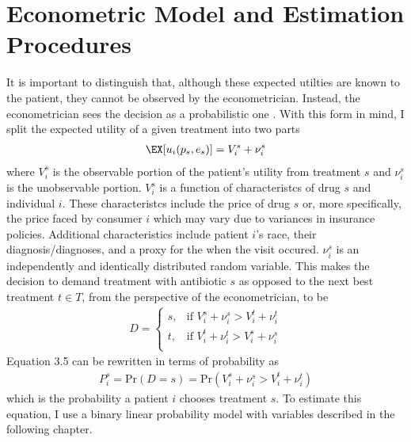 \section{Econometric Model and Estimation Procedures}
\indent It is important to distinguish that, although these expected utilties are known to the patient, they cannot be observed by the econometrician. Instead, the econometrician sees the decision as a probabilistic one \cite{train_discrete_nodate, templeton_household_2008}. With this form in mind, I split the expected utility of a given treatment into two parts
\begin{eqnarray}
\EX[u_i(p_s,e_s)] = V_i^s + \nu_i^s
\end{eqnarray}
where $V_i^s$ is the observable portion of the patient's utility from treatment $s$ and $\nu_i^s$ is the unobservable portion. $V_i^s$ is a function of characteristcs of drug $s$ and individual $i$. These characteristcs include the price of drug $s$ or, more specifically, the price faced by consumer $i$ which may vary due to variances in insurance policies. Additional characteristics include patient $i$'s race, their diagnosis/diagnoses, and a proxy for the when the visit occured. $\nu_i^s$ is an independently and identically distributed random variable. This makes the decision to demand treatment with antibiotic $s$ as opposed to the next best treatment $t \in T$, from the perspective of the econometrician, to be
\begin{eqnarray}
  D =
  \begin{cases}
                                   s, & \text{if }V_i^s + \nu_i^s > V_i^t + \nu_i^t \\
                                   t, & \text{if }V_i^t + \nu_i^t > V_i^s + \nu_i^s \\
  \end{cases}
\end{eqnarray}
Equation 3.5 can be rewritten in terms of probability as
\begin{eqnarray}
P_i^s =\text{Pr}(D = s) = \text{Pr}(V_i^s + \nu_i^s > V_i^t + \nu_i^t)
\end{eqnarray}
which is the probability a patient $i$ chooses treatment $s$. To estimate this equation, I use a binary linear probability model with variables described in the following chapter.